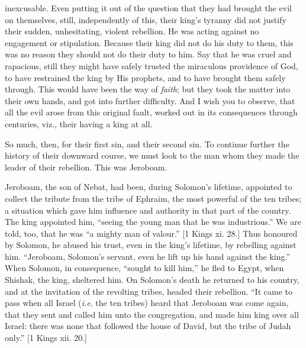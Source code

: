 inexcusable. Even putting it out of the question that they had brought
the evil on themselves, still, independently of this, their king's
tyranny did not justify their sudden, unhesitating, violent rebellion.
He was acting against no engagement or stipulation. Because their king
did not do his duty to them, this was no reason they should not do
their duty to him. Say that he was cruel and rapacious, still they
might have safely trusted the miraculous providence of God, to have
restrained the king by His prophets, and to have brought them safely
through. This would have been the way of \emph{faith}; but they took
the matter into their own hands, and got into further difficulty. And
I wish you to observe, that all the evil arose from this original
fault, worked out in its consequences through centuries, viz., their
having a king at all.

So much, then, for their first sin, and their second sin. To
continue further the history of their downward course, we must look to
the man whom they made the leader of their rebellion. This was
Jeroboam.

Jeroboam, the son of Nebat, had been, during Solomon's lifetime,
appointed to collect the tribute from the tribe of Ephraim, the most
powerful of the ten tribes; a situation which gave him influence and
authority in that part of the country. The king appointed him,
``seeing the young man that he was industrious.'' We are told,
too, that he was ``a mighty man of valour.'' [1 Kings xi. 28.]
Thus honoured by Solomon, he abused his trust, even in the king's
lifetime, by rebelling against him. ``Jeroboam, Solomon's
servant, even he lift up his hand against the king.'' When
Solomon, in consequence, ``sought to kill him,'' he fled to
Egypt, when Shishak, the king, sheltered him. On Solomon's death he
returned to his country, and at the invitation of the revolting
tribes, headed their rebellion. ``It came to pass when all Israel
(\emph{i.e}. the ten tribes) heard that Jeroboam was come again, that
they sent and called him unto the congregation, and made him king over
all Israel: there was none that followed the house of David, but the
tribe of Judah only.'' [1 Kings xii. 20.]

